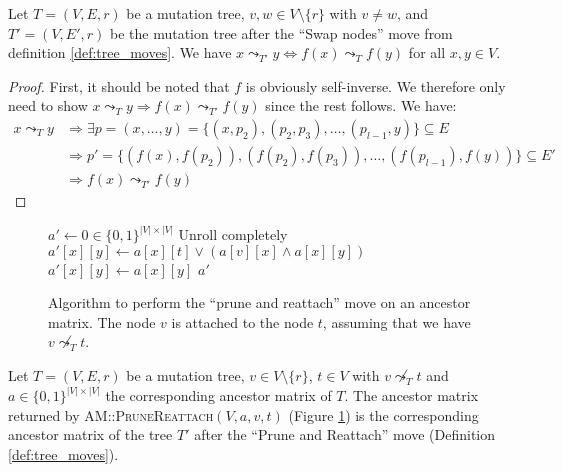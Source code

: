 \begin{lemma}
    \label{lem:swap_nodes_property}
    Let $T = (V, E, r)$ be a mutation tree, $v, w \in V \setminus \{r\}$ with $v \neq w$, and $T' = (V, E', r)$ be the mutation tree after the ``Swap nodes'' move from definition \ref{def:tree_moves}. We have $x \leadsto_{T'} y \Leftrightarrow f(x) \leadsto_T f(y)$ for all $x, y \in V$.
\end{lemma}

\begin{proof}
    First, it should be noted that $f$ is obviously self-inverse. We therefore only need to show $x \leadsto_{T} y \Rightarrow f(x) \leadsto_{T'} f(y)$ since the rest follows. We have:
    \begin{align*}
        x \leadsto_T y &\Rightarrow \exists p = (x, \dots, y) = \{(x, p_2), (p_2, p_3), \dots, (p_{l-1}, y)\} \subseteq E \\
        &\Rightarrow p' = \{(f(x), f(p_2)), (f(p_2), f(p_3)), \dots, (f(p_{l-1}), f(y))\} \subseteq E' \\
        &\Rightarrow f(x) \leadsto_{T'} f(y)
    \end{align*}
\end{proof}

\begin{figure}[p]
    \begin{algorithmic}[1]
            \State $a' \leftarrow 0 \in \{0,1\}^{|V| \times |V|}$
                 \Comment Unroll completely
                        \State $a'[x][y] \leftarrow a[x][t] \vee (a[v][x] \wedge a[x][y])$
                    \Else
                        \State $a'[x][y] \leftarrow a[x][y]$
                    \EndIf
                \EndFor
            \EndFor
            \State \Return $a'$
        \EndFunction
    \end{algorithmic}
    \caption{Algorithm to perform the ``prune and reattach'' move on an ancestor matrix. The node $v$ is attached to the node $t$, assuming that we have $v \not\leadsto_T t$.}
    \label{alg:am_prune_reattach}
\end{figure}

\begin{theorem}
    \label{theo:prune_reattach_correctness}
    Let $T = (V, E, r)$ be a mutation tree, $v \in V \setminus \{r\}$, $t \in V$ with $v \not\leadsto_T t$ and $a \in \{0,1\}^{|V| \times |V|}$ the corresponding ancestor matrix of $T$. The ancestor matrix returned by \textsc{AM::PruneReattach}$(V, a, v, t)$ (Figure \ref{alg:am_prune_reattach}) is the corresponding ancestor matrix of the tree $T'$ after the ``Prune and Reattach'' move (Definition \ref{def:tree_moves}).
\end{theorem}

